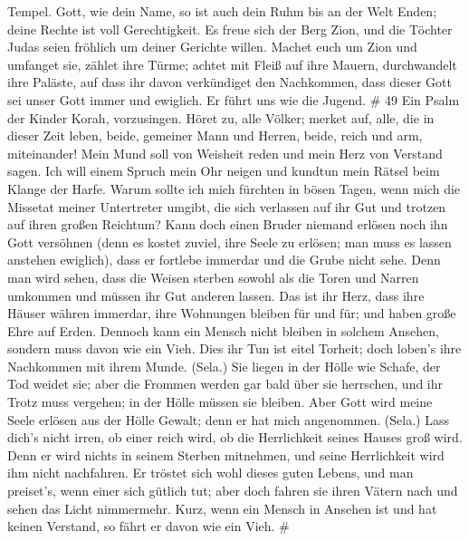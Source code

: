 Tempel.  Gott, wie dein Name, so ist auch dein Ruhm bis an
der Welt Enden; deine Rechte ist voll Gerechtigkeit.  Es
freue sich der Berg Zion, und die Töchter Judas seien fröhlich um deiner
Gerichte willen.  Machet euch um Zion und umfanget sie,
zählet ihre Türme;  achtet mit Fleiß auf ihre Mauern,
durchwandelt ihre Paläste, auf dass ihr davon verkündiget den
Nachkommen,  dass dieser Gott sei unser Gott immer und
ewiglich. Er führt uns wie die Jugend. \# 49  Ein Psalm der
Kinder Korah, vorzusingen.  Höret zu, alle Völker; merket
auf, alle, die in dieser Zeit leben,  beide, gemeiner Mann
und Herren, beide, reich und arm, miteinander!  Mein Mund
soll von Weisheit reden und mein Herz von Verstand sagen. 
Ich will einem Spruch mein Ohr neigen und kundtun mein Rätsel beim
Klange der Harfe.  Warum sollte ich mich fürchten in bösen
Tagen, wenn mich die Missetat meiner Untertreter umgibt, 
die sich verlassen auf ihr Gut und trotzen auf ihren großen Reichtum?
 Kann doch einen Bruder niemand erlösen noch ihn Gott
versöhnen  (denn es kostet zuviel, ihre Seele zu erlösen;
man muss es lassen anstehen ewiglich),  dass er fortlebe
immerdar und die Grube nicht sehe.  Denn man wird sehen,
dass die Weisen sterben sowohl als die Toren und Narren umkommen und
müssen ihr Gut anderen lassen.  Das ist ihr Herz, dass ihre
Häuser währen immerdar, ihre Wohnungen bleiben für und für; und haben
große Ehre auf Erden.  Dennoch kann ein Mensch nicht
bleiben in solchem Ansehen, sondern muss davon wie ein Vieh.
 Dies ihr Tun ist eitel Torheit; doch loben's ihre
Nachkommen mit ihrem Munde. (Sela.)  Sie liegen in der
Hölle wie Schafe, der Tod weidet sie; aber die Frommen werden gar bald
über sie herrschen, und ihr Trotz muss vergehen; in der Hölle müssen sie
bleiben.  Aber Gott wird meine Seele erlösen aus der Hölle
Gewalt; denn er hat mich angenommen. (Sela.)  Lass dich's
nicht irren, ob einer reich wird, ob die Herrlichkeit seines Hauses groß
wird.  Denn er wird nichts in seinem Sterben mitnehmen, und
seine Herrlichkeit wird ihm nicht nachfahren.  Er tröstet
sich wohl dieses guten Lebens, und man preiset's, wenn einer sich
gütlich tut;  aber doch fahren sie ihren Vätern nach und
sehen das Licht nimmermehr.  Kurz, wenn ein Mensch in
Ansehen ist und hat keinen Verstand, so fährt er davon wie ein Vieh. \#
